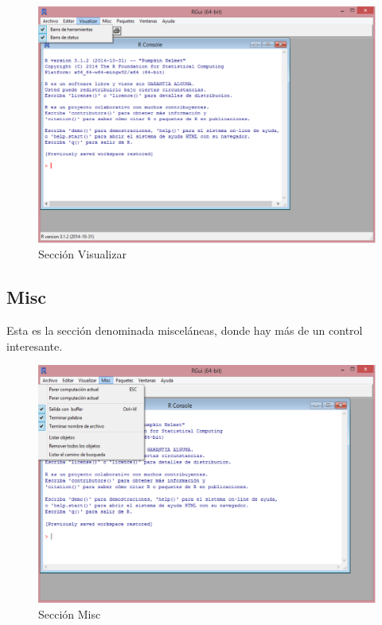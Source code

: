 \documentclass[11pt,a4paper,oneside]{book}\usepackage[]{graphicx}\usepackage[]{color}
\begin{document}
\begin{itemize}
  \begin{figure}[H]
  \centering
  \includegraphics[scale=.4]{figuras/visualizar.eps}
  \caption{Sección Visualizar}
  \label{visualizar}
  \end{figure}

\subsection{Misc} 

Esta es la sección denominada misceláneas, donde hay más de un control interesante.

  \begin{figure}[H]
  \centering
  \includegraphics[scale=.4]{figuras/misc.eps}
  \caption{Sección Misc}
  \label{misc}
  \end{figure}


\end{itemize}
\end{document}
